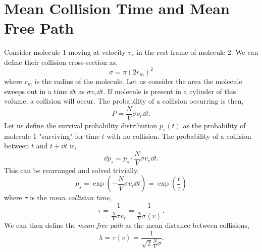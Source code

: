 \documentclass{book}
\begin{document}
\section{Mean Collision Time and Mean Free Path}
Consider molecule 1 moving at velocity $v_r$ in the rest frame of molecule 2. We can define their collision cross-section as,
\begin{equation}
	\sigma = \pi(2r_m)^2
\end{equation}
where $r_m$ is the radius of the molecule. Let us consider the area the molecule sweeps out in a time $\dd{t}$ as $\sigma v_r \dd{t}$. If molecule is present in a cylinder of this volume, a collision will occur. The probability of a collision occurring is then,
\begin{equation}
	P = \frac{N}{V}\sigma v_r \dd{t}.
\end{equation}
Let us define the survival probability distribution $p_s(t)$ as the probability of molecule 1 "surviving" for time $t$ with no collision. The probability of a collision between $t$ and $t + \dd{t}$ is,
\begin{equation}
	\dd{p_s} = p_s\cdot\frac{N}{V}\sigma v_r \dd{t}.
\end{equation}
This can be rearranged and solved trivially,
\begin{equation}
	\boxed{p_s = \exp\left(-\frac{N}{V}\sigma v_r \dd{t}\right) = \exp\left(\frac{t}{\tau}\right)}
\end{equation}
where $\tau$ is the \textit{mean collision time},
\begin{equation}
	\boxed{\tau = \frac{1}{\frac{N}{V}\sigma v_r} = \frac{1}{\frac{N}{V}\sigma\left<v\right>}}.
\end{equation}
We can then define the \textit{mean free path} as the mean distance between collisions,
\begin{equation}
	\lambda = \tau \left<v\right> = \frac{1}{\sqrt{2}\frac{N}{V}\sigma}.
\end{equation}
\end{document}
